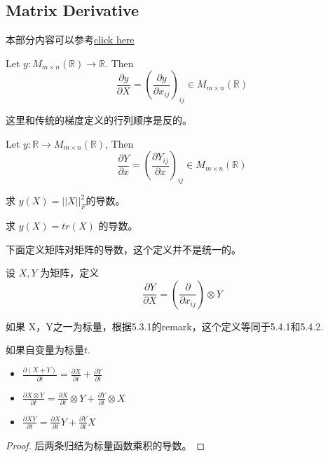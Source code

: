 \documentclass[11pt,fleqn]{book} %
\def\R{\mathbb{R}}
\begin{document}
\begin{CJK}{UTF8}{gkai}
\section{Matrix Derivative}
本部分内容可以参考\href{https://en.wikipedia.org/wiki/Matrix_calculus#References}{click here}

\begin{definition}
    [标量函数对矩阵求导] Let $y: M_{m\times n}(\R) \to \R$. Then \[
        \frac {\partial y} {\partial X} = \left(\frac{\partial y}{\partial x_{ij}}\right)_{ij} \in M_{m\times n}(\R)
         \]
\end{definition}
\begin{remark}
    这里和传统的梯度定义的行列顺序是反的。
\end{remark}

\begin{definition}
     Let $y:  \R \to M_{m\times n}(\R) $, Then 
    \[
        \frac {\partial Y} {\partial x} = \left(\frac{\partial Y_{ij}}{\partial x}\right)_{ij} \in M_{m\times n}(\R)
        \]
\end{definition}

\begin{example}
    求 $y(X) = ||X||_F^2$的导数。
\end{example}
\begin{example}
    求 $y(X) = tr (X)$ 的导数。
\end{example}

下面定义矩阵对矩阵的导数，这个定义并不是统一的。
\begin{definition}
    设 $X,Y$ 为矩阵，定义
     \[
        \frac{\partial Y}{\partial X} = (\frac{\partial }{\partial x_{ij}}) \otimes Y
        \]
\end{definition}
\begin{remark}
    如果 X，Y之一为标量，根据5.3.1的remark，这个定义等同于5.4.1和5.4.2.
\end{remark}

\begin{property}
    如果自变量为标量$t$. \\
    \begin{itemize}
        \item $\frac{\partial (X + Y)}{\partial t} = \frac{\partial X}{\partial t} + \frac{\partial Y}{\partial t}$
        \item $\frac{\partial X\otimes Y}{\partial t} =\frac{\partial X}{\partial t} \otimes Y + \frac{\partial Y}{\partial t} \otimes X$
        \item $\frac{\partial XY}{\partial t} =\frac{\partial X}{\partial t} Y + \frac{\partial Y}{\partial t} X$
    \end{itemize}
\end{property}
\begin{proof}
    后两条归结为标量函数乘积的导数。
\end{proof}


\end{CJK}
\end{document}
